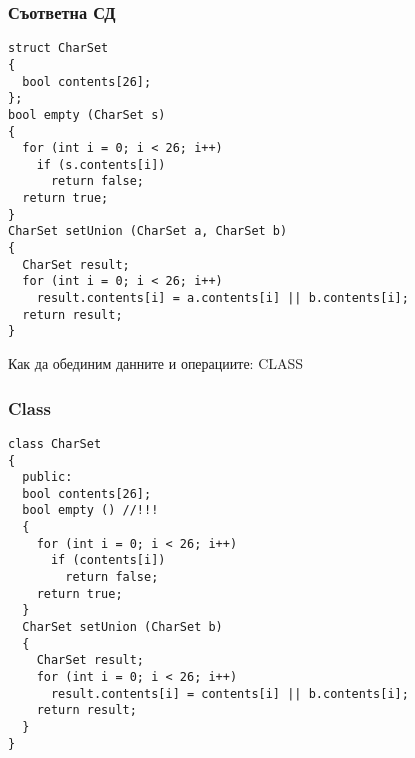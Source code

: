 \documentclass{beamer}
\begin{document}
\begin{frame}[fragile]
\frametitle{Съответна СД}


\begin{flushleft}
\begin{lstlisting}
struct CharSet
{
  bool contents[26];
};
bool empty (CharSet s)
{
  for (int i = 0; i < 26; i++)
    if (s.contents[i])
      return false;
  return true;
}
CharSet setUnion (CharSet a, CharSet b)
{
  CharSet result;
  for (int i = 0; i < 26; i++)
    result.contents[i] = a.contents[i] || b.contents[i];
  return result;
}
\end{lstlisting}
\end{flushleft}


\end{frame}


\begin{frame}
\centerline{Как да обединим данните и операциите: CLASS}
\end{frame}



\begin{frame}[fragile]
\frametitle{Class}


\begin{flushleft}
\begin{lstlisting}
class CharSet
{
  public:
  bool contents[26];
  bool empty () //!!!
  {
    for (int i = 0; i < 26; i++)
      if (contents[i])
        return false;
    return true;
  }
  CharSet setUnion (CharSet b)
  {
    CharSet result;
    for (int i = 0; i < 26; i++)
      result.contents[i] = contents[i] || b.contents[i];
    return result;
  }
}
\end{lstlisting}
\end{flushleft}


\end{frame}
\end{document}
